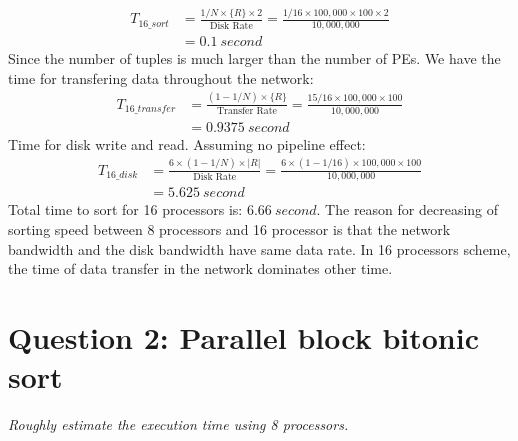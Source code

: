 \documentclass[a4paper,12pt]{article}
\begin{document}
\begin{equation*}
	\begin{aligned}
		T_{16\_sort} & = \frac{1/N \times \{R\} \times 2}{\mbox{Disk Rate}}
		 = \frac{1/16 \times 100,000 \times 100 \times 2}{10,000,000} \\
		& = 0.1\ second
	\end{aligned}
\end{equation*}
\noindent
Since the number of tuples is much larger than the number of PEs. We have the time for transfering data throughout the network:
\begin{equation*}
	\begin{aligned}
		T_{16\_transfer} & = \frac{(1-1/N) \times \{R\}}{\mbox{Transfer Rate}}
		 = \frac{15/16 \times 100,000 \times 100}{10,000,000} \\
		& = 0.9375\ second
	\end{aligned}
\end{equation*}
Time for disk write and read. Assuming no pipeline effect:
\begin{equation*}
	\begin{aligned}
		 T_{16\_disk} & = \frac{6 \times (1 - 1/N) \times |R|}{\mbox{Disk Rate}}
					  = \frac{6 \times (1 - 1/16) \times 100,000 \times 100}{10,000,000} \\
					 & = 5.625\ second
	\end{aligned}
\end{equation*}
Total time to sort for 16 processors is: $6.66\ second$. The reason for decreasing of sorting speed between 8 processors and 16 processor is that the network bandwidth and the disk bandwidth have same data rate. In 16 processors scheme, the time of data transfer in the network dominates other time.












\section*{Question 2: Parallel block bitonic sort}
\setcounter{section}{1}

\textit{Roughly estimate the execution time using 8 processors.} 
\end{document}
